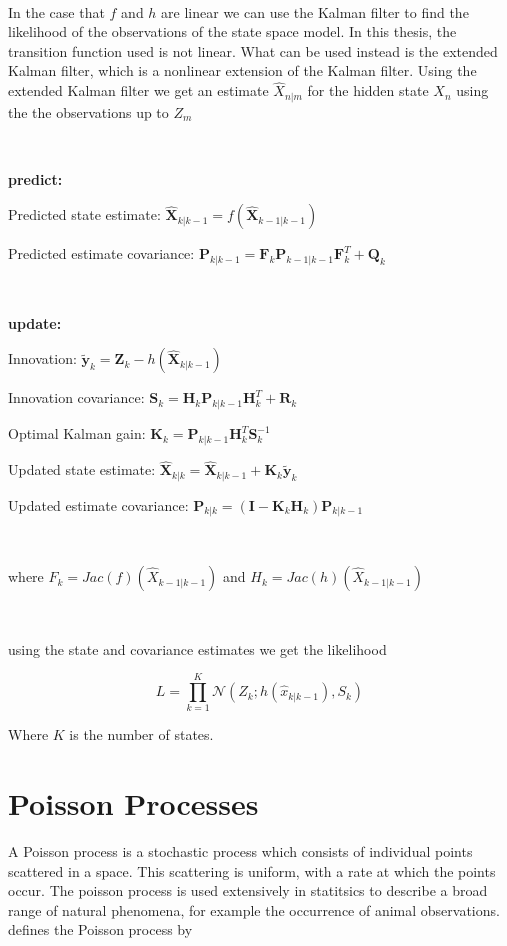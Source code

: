 \ 
 
 In the case that $f$ and $h$ are linear we can use the Kalman filter to find the likelihood of the observations of the state space model. In this thesis, the transition function used is not linear. What can be used instead is the extended Kalman filter, which is a nonlinear extension of the Kalman filter. Using the extended Kalman filter we get an estimate $\hat{X}_{n|m}$ for the hidden state $X_n$ using the the observations up to $Z_m$


\

\textbf{predict:}

Predicted state estimate: $\bm{\hat X}_{k|k-1} = f(\bm{\hat X}_{k-1|k-1} )$

Predicted estimate covariance: $\textbf{P}_{k|k-1} = \textbf{F}_k\textbf{P}_{k-1|k-1} \textbf{F}_k^T + \textbf{Q}_k$

\

\textbf{update:}

Innovation: $\bm{\tilde y}_{k} = \textbf{Z}_k - h(\bm{\hat X}_{k|k-1})$

Innovation covariance: $\textbf{S}_k = \textbf{H}_k \textbf{P}_{k|k-1}\textbf{H}_k^T + \textbf{R}_k$

Optimal Kalman gain: $\textbf{K}_k = \textbf{P}_{k|k-1} \textbf{H}_k^T \textbf{S}_k^{-1}$

Updated state estimate: $\bm{\hat X}_{k|k} = \bm{\hat X}_{k|k-1} + \textbf{K}_k \bm{\tilde y}_{k}$

Updated estimate covariance: $\textbf{P}_{k|k} = (\textbf{I} - \textbf{K}_k \textbf{H}_k)\textbf{P}_{k|k-1}$



\

where  $F_k = Jac (f)(\hat{X}_{k-1|k-1})$ and $H_k = Jac( h)(\hat{X}_{k-1|k-1})$

\

using the state and covariance estimates we get the likelihood 

$$L = \prod_{k=1}^K \mathcal{N}(Z_k; h(\hat{x}_{k|k-1}), S_k) \label{EKF likelihood}$$

Where $K$ is the number of states.
\parencite{kulikov_extended_2024}



\section{Poisson Processes}
A Poisson process is a stochastic process which consists of individual points scattered in a space. This scattering is uniform, with a rate at which the points occur. The poisson process is used extensively in statitsics to describe a broad range of natural phenomena, for example the occurrence of animal observations. \parencite{Pinsky2011} defines the Poisson process by 

